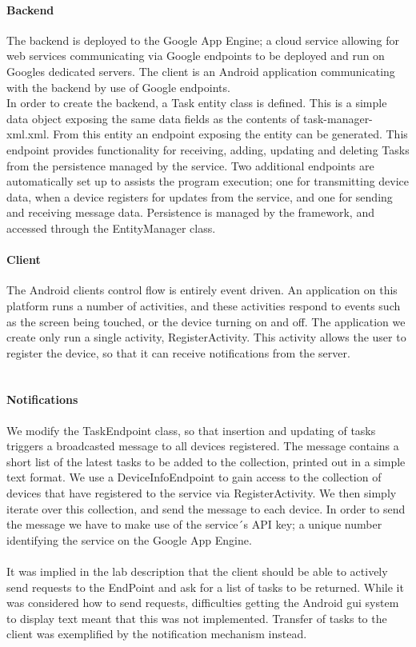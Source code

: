 \paragraph{Backend} The backend is deployed to the Google App Engine; a cloud service allowing for web services communicating via Google endpoints to be deployed and run on Googles dedicated servers. The client is an Android application communicating with the backend by use of Google endpoints.\\
In order to create the backend, a Task entity class is defined. This is a simple data object exposing the same data fields as the contents of task-manager-xml.xml. From this entity an endpoint exposing the entity can be generated. This endpoint provides functionality for receiving, adding, updating and deleting Tasks from the persistence managed by the service. Two additional endpoints are automatically set up to assists the program execution; one for transmitting device data, when a device registers for updates from the service, and one for sending and receiving message data. Persistence is managed by the framework, and accessed through the EntityManager class.\\
\paragraph{Client} The Android clients control flow is entirely event driven. An application on this platform runs a number of activities, and these activities respond to events such as the screen being touched, or the device turning on and off. The application we create only run a single activity, RegisterActivity. This activity allows the user to register the device, so that it can receive notifications from the server. \\\\
\paragraph{Notifications} We modify the TaskEndpoint class, so that insertion and updating of tasks triggers a broadcasted message to all devices registered. The message contains a short list of the latest tasks to be added to the collection, printed out in a simple text format. We use a DeviceInfoEndpoint to gain access to the collection of devices that have registered to the service via RegisterActivity. We then simply iterate over this collection, and send the message to each device. In order to send the message we have to make use of the service´s API key; a unique number identifying the service on the Google App Engine. \\\\
It was implied in the lab description that the client should be able to actively send requests to the EndPoint and ask for a list of tasks to be returned. While it was considered how to send requests, difficulties getting the Android gui system to display text meant that this was not implemented. Transfer of tasks to the client was exemplified by the notification mechanism instead.

